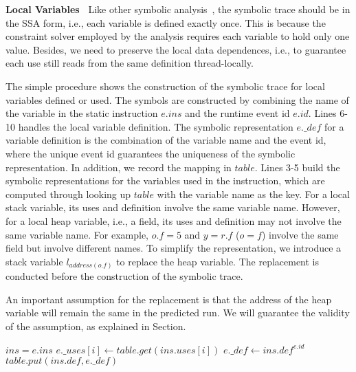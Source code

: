 



{\bf Local Variables\  }
Like other symbolic analysis~\cite{jeff,chao}, the symbolic trace should be in the SSA form, i.e., each variable is defined exactly once. This is because the constraint solver employed by the analysis requires each variable to hold only one value. Besides, we need to preserve the local data dependences, i.e., to guarantee each use still reads from the same definition thread-locally. 

The  simple procedure shows the construction of the symbolic trace for local variables defined or used. The symbols are constructed by combining the 
name of the variable in the static instruction $e.ins$ and the runtime event id $e.id$. Lines 6-10 handles the local variable definition.  The symbolic representation $e.\_def$ for a variable definition is the combination of the variable name and the event id, where  the unique event id guarantees the uniqueness of the symbolic representation.  In addition, we record the mapping in $table$.  
Lines 3-5 build the symbolic representations for the variables used in the instruction, which are computed through looking up $table$ with the variable name as the key. For a local stack variable, its uses and definition involve the same variable name. However, for a local heap variable, i.e.,  a field, its uses and definition may not involve the same variable name. For example, $o.f=5$ and $y=r.f$ ($o=f$) involve the same field but involve different names. 
To simplify the representation, we introduce a stack variable $l_{address(o.f)}$ to replace the heap variable. The replacement is conducted before the construction of the symbolic trace.

An important assumption for the replacement is that the address of the heap variable will remain the same in the predicted run. We will guarantee the validity of the assumption, as explained in Section. 






\begin{algorithmic}[3]
\State $ins=e.ins$
 \State $e.\_uses[i] \gets table.get(ins.uses[i])$
 \EndFor
    \State $ e.\_def \gets ins.def^{e.id}$
	\State $ table.put(ins.def,  e.\_def)$
 \EndIf
\EndFor
\end{algorithmic}


